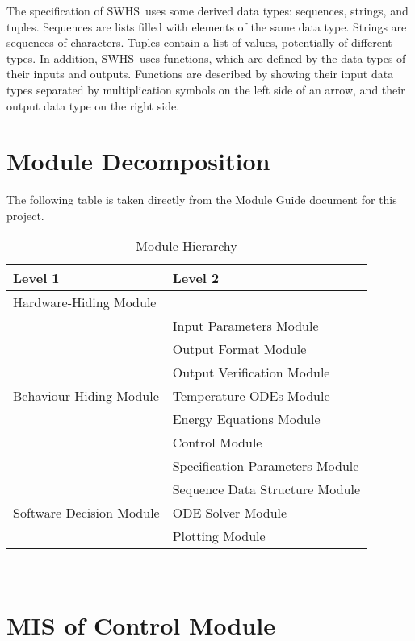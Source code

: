 \documentclass[12pt]{article}
\newcommand{\progname}{SWHS}
\begin{document}
\noindent
The specification of \progname \ uses some derived data types: sequences, strings, and
tuples. Sequences are lists filled with elements of the same data type. Strings
are sequences of characters. Tuples contain a list of values, potentially of
different types. In addition, \progname \ uses functions, which
are defined by the data types of their inputs and outputs. Functions are
described by showing their input data types separated by multiplication symbols
on the left side of an arrow, and their output data type on the right side.

\section{Module Decomposition}

The following table is taken directly from the Module Guide document for this project.

\begin{table}[h!]
\centering
\begin{tabular}{p{} p{}}
\toprule
\textbf{Level 1} & \textbf{Level 2}\\
\midrule

{Hardware-Hiding Module} & ~ \\
\midrule

\multirow{7}{0.3\textwidth}{Behaviour-Hiding Module} & Input Parameters Module\\
& Output Format Module\\
& Output Verification Module\\
& Temperature ODEs Module\\
& Energy Equations Module\\ 
& Control Module\\
& Specification Parameters Module\\
\midrule

\multirow{3}{0.3\textwidth}{Software Decision Module} & {Sequence Data Structure Module}\\
& ODE Solver Module\\
& Plotting Module\\
\bottomrule

\end{tabular}
\caption{Module Hierarchy}
\label{TblMH}
\end{table}

\newpage
~\newpage

\section{MIS of Control Module} \label{Main}
\end{document}
